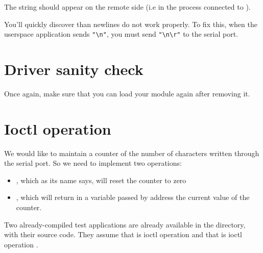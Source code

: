 The  string should appear on the remote side (i.e in
the  process connected to ).

You'll quickly discover than newlines do not work properly. To fix
this, when the userspace application sends \verb+"\n"+, you must send
\verb+"\n\r"+ to the serial port.

\section{Driver sanity check}

Once again, make sure that you can load your module again after
removing it.

\section{Ioctl operation}

We would like to maintain a counter of the number of characters
written through the serial port. So we need to implement two
 operations:
\begin{itemize}

 \item {}, which as its name says, will
   reset the counter to zero

 \item {}, which will return in a variable
   passed by address the current value of the counter.

\end{itemize}

Two already-compiled test applications are already available in the
 directory, with their source code. They assume that
 is ioctl operation  and that
 is ioctl operation .
